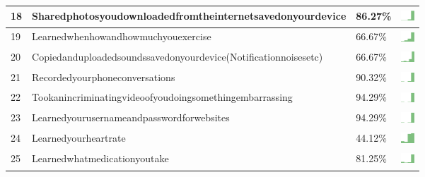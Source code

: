 \documentclass[a4paper,12pt]{article}
\begin{document}
\begin{longtable}{| p{0.5cm} | p{7cm} | p{1cm} | c |}
18 & Sharedphotosyoudownloadedfromtheinternetsavedonyourdevice & 86.27\% & \includegraphics[width = 0.5cm, height = 0.5cm]{sharedphotosyoudownloadedfromtheinternetsavedonyourdeviceWORKCONTACTS} \\ \hline 
19 & Learnedwhenhowandhowmuchyouexercise & 66.67\% & \includegraphics[width = 0.5cm, height = 0.5cm]{learnedwhenhowandhowmuchyouexerciseWORKCONTACTS} \\ \hline 
20 & Copiedanduploadedsoundssavedonyourdevice(Notificationnoisesetc) & 66.67\% & \includegraphics[width = 0.5cm, height = 0.5cm]{copiedanduploadedsoundssavedonyourdevice(notificationnoisesetc)WORKCONTACTS} \\ \hline 
21 & Recordedyourphoneconversations & 90.32\% & \includegraphics[width = 0.5cm, height = 0.5cm]{recordedyourphoneconversationsWORKCONTACTS} \\ \hline 
22 & Tookanincriminatingvideoofyoudoingsomethingembarrassing & 94.29\% & \includegraphics[width = 0.5cm, height = 0.5cm]{tookanincriminatingvideoofyoudoingsomethingembarrassingWORKCONTACTS} \\ \hline 
23 & Learnedyourusernameandpasswordforwebsites & 94.29\% & \includegraphics[width = 0.5cm, height = 0.5cm]{learnedyourusernameandpasswordforwebsitesWORKCONTACTS} \\ \hline 
24 & Learnedyourheartrate & 44.12\% & \includegraphics[width = 0.5cm, height = 0.5cm]{learnedyourheartrateWORKCONTACTS} \\ \hline 
25 & Learnedwhatmedicationyoutake & 81.25\% & \includegraphics[width = 0.5cm, height = 0.5cm]{learnedwhatmedicationyoutakeWORKCONTACTS} \\ \hline 

\end{longtable}
\end{document}
